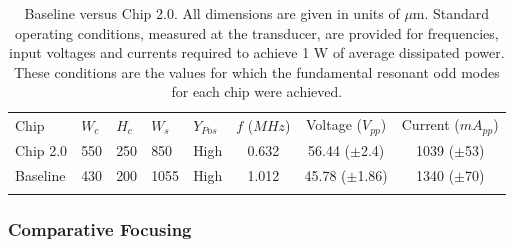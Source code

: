 \begin{table}[t]
	\caption[Standard operating conditions for Baseline versus Chip 2.0]{Baseline versus Chip 2.0. All dimensions are given in units of $\mu$m. Standard operating conditions, measured at the transducer, are provided for frequencies, input voltages and currents required to achieve 1 W of average dissipated power. These conditions are the values for which the fundamental resonant odd modes for each chip were achieved.}
\label{tab:comparison}       %
\centering
\begin{tabular}{lllll | ccc}
\hline\noalign{\smallskip}
Chip & $W_c$ & $H_c$ & $W_s$ & $Y_{Pos}$ & $f$ ($MHz$) & Voltage ($V_{pp}$) & Current ($mA_{pp}$) \\
\noalign{\smallskip}\hline\noalign{\smallskip}
Chip 2.0 & 550 & 250 & 850 & High & 0.632 & 56.44 ($\pm$2.4) & 1039 ($\pm$53)\\
Baseline & 430 & 200 &  1055 & High & 1.012 & 45.78 ($\pm$1.86)& 1340 ($\pm$70)\\ 
\noalign{\smallskip}\hline
\end{tabular}
\end{table}

\subsubsection{Comparative Focusing}
\label{sssec:comparisonFocusing}

